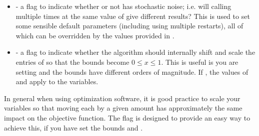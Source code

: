 \documentclass[letterpaper,10pt,english]{sphinxmanual}
\begin{document}
\begin{itemize}
\item {} 
 - a flag to indicate whether or not  has stochastic noise; i.e. will calling  multiple times at the same value of  give different results? This is used to set some sensible default parameters (including using multiple restarts), all of which can be overridden by the values provided in .

\item {} 
 - a flag to indicate whether the algorithm should internally shift and scale the entries of  so that the bounds become \(0 \leq x \leq 1\). This is useful is you are setting  and the bounds have different orders of magnitude. If , the values of  and  apply to the  variables.

\end{itemize}

In general when using optimization software, it is good practice to scale your variables so that moving each by a given amount has approximately the same impact on the objective function.
The  flag is designed to provide an easy way to achieve this, if you have set the bounds  and .
\end{document}
